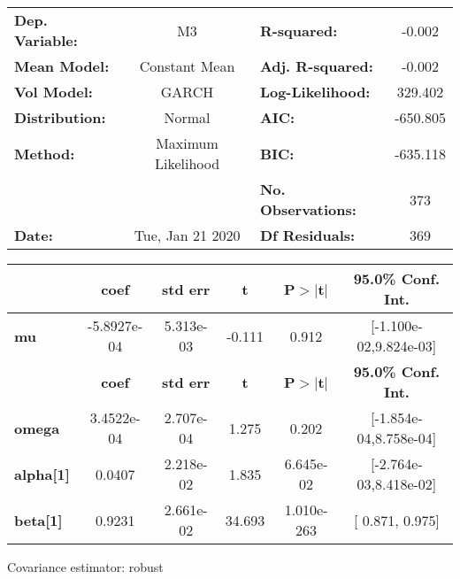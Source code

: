 \begin{center}
\begin{tabular}{lclc}
\toprule
\textbf{Dep. Variable:} &         M3         & \textbf{  R-squared:         } &    -0.002   \\
\textbf{Mean Model:}    &   Constant Mean    & \textbf{  Adj. R-squared:    } &    -0.002   \\
\textbf{Vol Model:}     &       GARCH        & \textbf{  Log-Likelihood:    } &    329.402  \\
\textbf{Distribution:}  &       Normal       & \textbf{  AIC:               } &   -650.805  \\
\textbf{Method:}        & Maximum Likelihood & \textbf{  BIC:               } &   -635.118  \\
\textbf{}               &                    & \textbf{  No. Observations:  } &    373      \\
\textbf{Date:}          &  Tue, Jan 21 2020  & \textbf{  Df Residuals:      } &    369      \\
\bottomrule
\end{tabular}
\begin{tabular}{lccccc}
            & \textbf{coef} & \textbf{std err} & \textbf{t} & \textbf{P$>$$|$t$|$} & \textbf{95.0\% Conf. Int.}  \\
\midrule
\textbf{mu} &  -5.8927e-04  &    5.313e-03     &    -0.111  &          0.912       &   [-1.100e-02,9.824e-03]    \\
                  & \textbf{coef} & \textbf{std err} & \textbf{t} & \textbf{P$>$$|$t$|$} & \textbf{95.0\% Conf. Int.}  \\
\midrule
\textbf{omega}    &   3.4522e-04  &    2.707e-04     &     1.275  &          0.202       &   [-1.854e-04,8.758e-04]    \\
\textbf{alpha[1]} &       0.0407  &    2.218e-02     &     1.835  &      6.645e-02       &   [-2.764e-03,8.418e-02]    \\
\textbf{beta[1]}  &       0.9231  &    2.661e-02     &    34.693  &      1.010e-263      &     [  0.871,  0.975]       \\
\bottomrule
\end{tabular}
\end{center}

Covariance estimator: robust